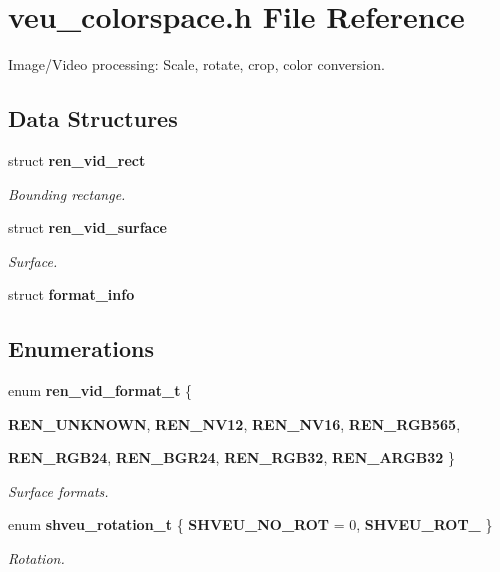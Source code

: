 \section{veu\_\-colorspace.h File Reference}
\label{veu__colorspace_8h}


Image/Video processing: Scale, rotate, crop, color conversion.  


\subsection*{Data Structures}
\begin{DoxyCompactItemize}
\item 
struct {\bf ren\_\-vid\_\-rect}
\begin{DoxyCompactList}\small\item\em Bounding rectange. \item\end{DoxyCompactList}\item 
struct {\bf ren\_\-vid\_\-surface}
\begin{DoxyCompactList}\small\item\em Surface. \item\end{DoxyCompactList}\item 
struct {\bf format\_\-info}
\end{DoxyCompactItemize}
\subsection*{Enumerations}
\begin{DoxyCompactItemize}
\item 
enum {\bf ren\_\-vid\_\-format\_\-t} \{ \par
{\bfseries REN\_\-UNKNOWN}, 
{\bf REN\_\-NV12}, 
{\bf REN\_\-NV16}, 
{\bf REN\_\-RGB565}, 
\par
{\bf REN\_\-RGB24}, 
{\bf REN\_\-BGR24}, 
{\bf REN\_\-RGB32}, 
{\bf REN\_\-ARGB32}
 \}
\begin{DoxyCompactList}\small\item\em Surface formats. \item\end{DoxyCompactList}\item 
enum {\bf shveu\_\-rotation\_\-t} \{ {\bf SHVEU\_\-NO\_\-ROT} = 0, 
{\bf SHVEU\_\-ROT\_}
 \}
\begin{DoxyCompactList}\small\item\em Rotation. \item\end{DoxyCompactList}\end{DoxyCompactItemize}
